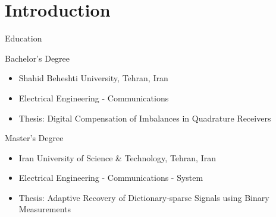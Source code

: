 \section{Introduction}
\begin{frame}{Education}{}
	\begin{block}{Bachelor's Degree}
		\begin{itemize}
			\item Shahid Beheshti University, Tehran, Iran
			\item Electrical Engineering - Communications
			\item Thesis: Digital Compensation of Imbalances in Quadrature Receivers
		\end{itemize}
	\end{block}
	\begin{block}{Master's Degree}
		\begin{itemize}
			\item Iran University of Science & Technology, Tehran, Iran
			\item Electrical Engineering - Communications - System
			\item Thesis: Adaptive Recovery of Dictionary-sparse Signals using Binary Measurements
		\end{itemize}
	\end{block}
\end{frame}
